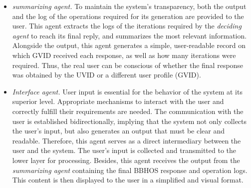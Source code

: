 \begin{itemize}
    \item \textit{summarizing agent.} To maintain the system's transparency, both the output and the log of the operations required for its generation are provided to the user. This agent extracts the logs of the iterations required by the \textit{deciding agent} to reach its final reply, and summarizes the most relevant information. Alongside the output, this agent generates a simple, user-readable record on which GVID received each response, as well as how many iterations were required. Thus, the real user can be conscious of whether the final response was obtained by the UVID or a different user profile (GVID).
    
    \item \textit{Interface agent.} User input is essential for the behavior of the system at its superior level. Appropriate mechanisms to interact with the user and correctly fulfill their requirements are needed. The communication with the user is established bidirectionally, implying that the system not only collects the user's input, but also generates an output that must be clear and readable. Therefore, this agent serves as a direct intermediary between the user and the system. The user's input is collected and transmitted to the lower layer for processing. Besides, this agent receives the output from the \textit{summarizing agent} containing the final BBHOS response and operation logs. This content is then displayed to the user in a simplified and visual format.
\end{itemize}

